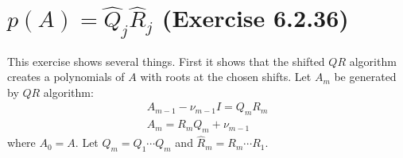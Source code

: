 \documentclass[10pt,letterpaper]{article}
\newcommand{\QR}{\ensuremath{QR} }
\begin{document}
\section{$p(A) = \hat{Q}_j \hat{R}_j$ (Exercise 6.2.36)} \label{sec:QRPolynomial}
This exercise shows several things.  First it shows that the shifted \QR algorithm creates a polynomials of $A$ with roots at the chosen shifts.
Let $A_m$ be generated by \QR algorithm:
\begin{subequations}\begin{align}
    A_{m-1} - \nu_{m-1}I = Q_mR_m \\
    A_m = R_mQ_m + \nu_{m-1}
\end{align}\end{subequations}
where $A_0 = A$.  Let $\hat{Q}_m = Q_1\cdots Q_m$ and $\hat{R}_m = R_m \cdots R_1$.
\end{document}
